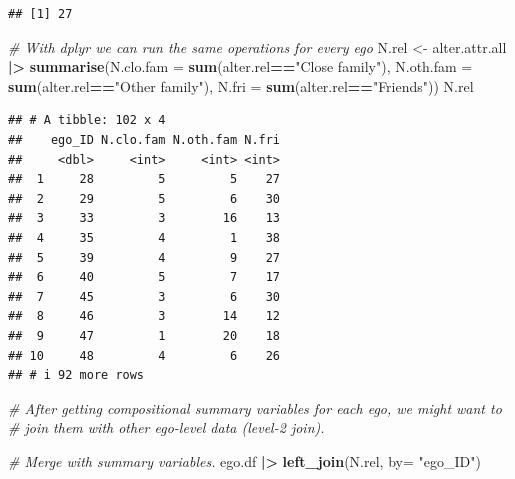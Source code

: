 \documentclass[
]{book}
\newenvironment{Shaded}{\begin{snugshade}}{\end{snugshade}}
\newcommand{\AttributeTok}[1]{\textcolor[rgb]{0.13,0.29,0.53}{#1}}
\newcommand{\CommentTok}[1]{\textcolor[rgb]{0.56,0.35,0.01}{\textit{#1}}}
\newcommand{\FunctionTok}[1]{\textcolor[rgb]{0.13,0.29,0.53}{\textbf{#1}}}
\newcommand{\NormalTok}[1]{#1}
\newcommand{\OtherTok}[1]{\textcolor[rgb]{0.56,0.35,0.01}{#1}}
\newcommand{\SpecialCharTok}[1]{\textcolor[rgb]{0.81,0.36,0.00}{\textbf{#1}}}
\newcommand{\StringTok}[1]{\textcolor[rgb]{0.31,0.60,0.02}{#1}}
\begin{document}
\begin{verbatim}
## [1] 27
\end{verbatim}

\begin{Shaded}
\begin{Highlighting}[]
\CommentTok{\# With dplyr we can run the same operations for every ego}
\NormalTok{N.rel }\OtherTok{\textless{}{-}}\NormalTok{ alter.attr.all }\SpecialCharTok{|\textgreater{}}
  \FunctionTok{summarise}\NormalTok{(}\AttributeTok{N.clo.fam =} \FunctionTok{sum}\NormalTok{(alter.rel}\SpecialCharTok{==}\StringTok{"Close family"}\NormalTok{),}
            \AttributeTok{N.oth.fam =} \FunctionTok{sum}\NormalTok{(alter.rel}\SpecialCharTok{==}\StringTok{"Other family"}\NormalTok{),}
            \AttributeTok{N.fri =} \FunctionTok{sum}\NormalTok{(alter.rel}\SpecialCharTok{==}\StringTok{"Friends"}\NormalTok{))}
\NormalTok{N.rel}
\end{Highlighting}
\end{Shaded}

\begin{verbatim}
## # A tibble: 102 x 4
##    ego_ID N.clo.fam N.oth.fam N.fri
##     <dbl>     <int>     <int> <int>
##  1     28         5         5    27
##  2     29         5         6    30
##  3     33         3        16    13
##  4     35         4         1    38
##  5     39         4         9    27
##  6     40         5         7    17
##  7     45         3         6    30
##  8     46         3        14    12
##  9     47         1        20    18
## 10     48         4         6    26
## # i 92 more rows
\end{verbatim}

\begin{Shaded}
\begin{Highlighting}[]
\CommentTok{\# After getting compositional summary variables for each ego, we might want to}
\CommentTok{\# join them with other ego{-}level data (level{-}2 join).}

\CommentTok{\# Merge with summary variables.}
\NormalTok{ego.df }\SpecialCharTok{|\textgreater{}}
  \FunctionTok{left\_join}\NormalTok{(N.rel, }\AttributeTok{by=} \StringTok{"ego\_ID"}\NormalTok{)}
\end{Highlighting}
\end{Shaded}
\end{document}
